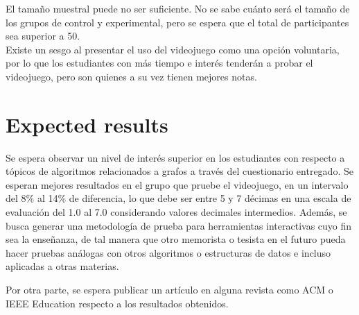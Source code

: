 \documentclass[submission]{eptcs}
\begin{document}
El tamaño muestral puede no ser suficiente. No se sabe cuánto será el tamaño de los grupos de control
y experimental, pero se espera que el total de participantes sea superior a 50. \\
Existe un sesgo al presentar el uso del videojuego como una opción voluntaria, por lo que los estudiantes
con más tiempo e interés tenderán a probar el videojuego, pero son quienes a su vez tienen mejores notas. \\


\section{Expected results}


Se espera observar un nivel de interés superior en los estudiantes con respecto a tópicos de algoritmos
relacionados a grafos a través del cuestionario entregado.
Se esperan mejores resultados en el grupo que pruebe el videojuego, en un intervalo del
8\% al 14\% de diferencia, lo que debe ser entre 5 y 7 décimas en una escala de evaluación del 1.0 al 7.0
considerando valores decimales intermedios.
Además, se busca generar una metodología de prueba para herramientas interactivas cuyo fin sea la enseñanza,
de tal manera que otro memorista o tesista en el futuro pueda hacer pruebas análogas con otros algoritmos
o estructuras de datos e incluso aplicadas a otras materias.

Por otra parte, se espera publicar un artículo en alguna revista
como ACM o IEEE Education respecto a los resultados obtenidos.


\nocite{*}


\end{document}
